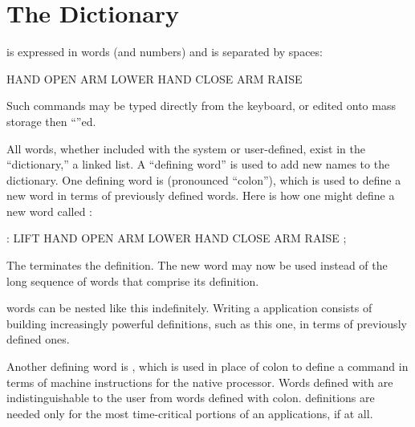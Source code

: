 \section{The Dictionary}%
%
%

\expandafter\initialb\Forth{} is expressed in words (and numbers) and is separated by spaces:
\begin{Code}
HAND OPEN  ARM LOWER  HAND CLOSE  ARM RAISE 
\end{Code}
Such commands may be typed directly from the keyboard, or edited onto 
mass storage then ``''ed.

All words, whether included with the system or user-defined, exist in the
``dictionary,'' a linked list.  A ``defining word'' is used to add new
names to the dictionary.  One defining word is \forthb{:} (pronounced
``colon''), which is used to define a new word in terms of previously
defined words.  Here is how one might define a new word called :
\begin{Code}
: LIFT   HAND OPEN  ARM LOWER  HAND CLOSE  ARM RAISE ;
\end{Code}
The \forthb{;} terminates the definition.  The new word  may
now be used instead of the long sequence of words that comprise its
definition.

\Forth{} words can be nested like this indefinitely.  Writing a 
\Forth{} application consists of building increasingly powerful definitions,
such as this one, in terms of previously defined ones.

Another defining word is ,
which is used in place of colon to define a command in terms of machine
instructions for the native processor.  Words defined with 
are indistinguishable to the user from words defined with colon.
 definitions are needed only for the most time-critical
portions of an applications, if at all.

